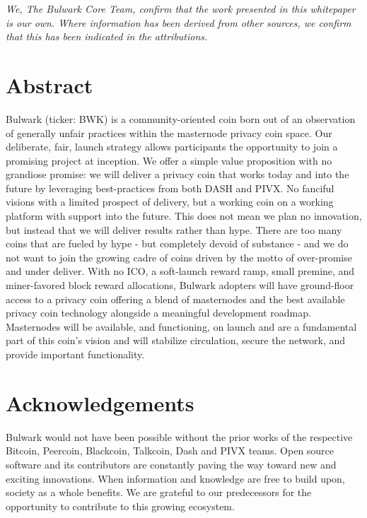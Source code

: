 \documentclass[11pt,a4paperpaper,]{report}
\begin{document}
\vspace*{\fill} \noindent
\textit{
We, The Bulwark Core Team, confirm that the work presented in this whitepaper is our own. Where information has been derived from other sources, we confirm that this has been indicated in the attributions.
} \vspace*{\fill} 

\chapter*{Abstract}\label{abstract}

Bulwark (ticker: BWK) is a community-oriented coin born out of an
observation of generally unfair practices within the masternode privacy
coin space. Our deliberate, fair, launch strategy allows participants
the opportunity to join a promising project at inception. We offer a
simple value proposition with no grandiose promise: we will deliver a
privacy coin that works today and into the future by leveraging
best-practices from both DASH and PIVX. No fanciful visions with a
limited prospect of delivery, but a working coin on a working platform
with support into the future. This does not mean we plan no innovation,
but instead that we will deliver results rather than hype. There are too
many coins that are fueled by hype - but completely devoid of substance
- and we do not want to join the growing cadre of coins driven by the
motto of over-promise and under deliver. With no ICO, a soft-launch
reward ramp, small premine, and miner-favored block reward allocations,
Bulwark adopters will have ground-floor access to a privacy coin
offering a blend of masternodes and the best available privacy coin
technology alongside a meaningful development roadmap. Masternodes will
be available, and functioning, on launch and are a fundamental part of
this coin's vision and will stabilize circulation, secure the network,
and provide important functionality. 
\setcounter{page}{1}

\chapter*{Acknowledgements}\label{acknowledgements}

Bulwark would not have been possible without the prior works of the
respective Bitcoin, Peercoin, Blackcoin, Talkcoin, Dash and PIVX teams.
Open source software and its contributors are constantly paving the way
toward new and exciting innovations. When information and knowledge are
free to build upon, society as a whole benefits. We are grateful to our
predecessors for the opportunity to contribute to this growing
ecosystem.
\end{document}
